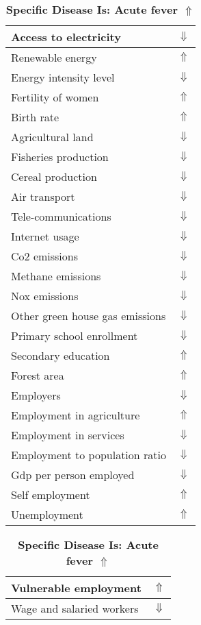 \documentclass[12pt,notitlepage,oneside]{report}
\begin{document}
\begin{table}[!htb]
\caption{\textbf{Specific Disease Is: Acute fever $\Uparrow$}}
\centering
\label{Correlated Socio-economic Factors0}
\begin{tabular}{|l|l|}
\hline
Access to electricity & $\Downarrow$\\ \hline
Renewable energy & $\Uparrow$\\ \hline
Energy intensity level & $\Downarrow$\\ \hline
Fertility of women & $\Uparrow$\\ \hline
Birth rate & $\Uparrow$\\ \hline
Agricultural land & $\Downarrow$\\ \hline
Fisheries production & $\Downarrow$\\ \hline
Cereal production & $\Downarrow$\\ \hline
Air transport  & $\Downarrow$\\ \hline
Tele-communications & $\Downarrow$\\ \hline
Internet usage & $\Downarrow$\\ \hline
Co2 emissions & $\Downarrow$\\ \hline
Methane emissions & $\Downarrow$\\ \hline
Nox emissions & $\Downarrow$\\ \hline
Other green house gas emissions & $\Downarrow$\\ \hline
Primary school enrollment & $\Downarrow$\\ \hline
Secondary education & $\Uparrow$\\ \hline
Forest area & $\Uparrow$\\ \hline
Employers & $\Downarrow$\\ \hline
Employment in agriculture & $\Uparrow$\\ \hline
Employment in services & $\Downarrow$\\ \hline
Employment to population ratio & $\Downarrow$\\ \hline
Gdp per person employed & $\Downarrow$\\ \hline
Self employment & $\Uparrow$\\ \hline
Unemployment & $\Uparrow$\\ \hline
\end{tabular}
\begin{tabular}{|l|l|}
\hline
Vulnerable employment & $\Uparrow$\\ \hline
Wage and salaried workers & $\Downarrow$\\ \hline

\end{tabular}
\end{table}
\end{document}
